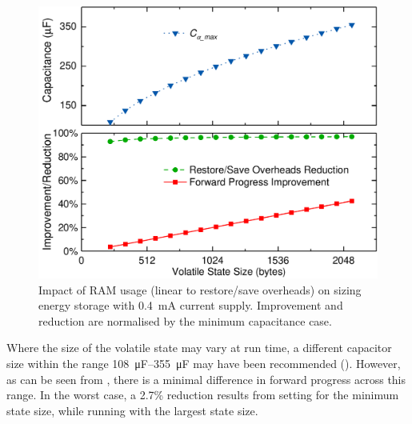 \begin{figure}
    \centering
    \includegraphics[width=\columnwidth]{ch3_sizingeffect/figures/RSTORAM3Fig}
    \caption{Impact of RAM usage (linear to restore/save overheads) on sizing energy storage with \SI{0.4}{\milli\ampere} current supply. Improvement and reduction are normalised by the minimum capacitance case. }
    \label{fig:ram}
\end{figure}

Where the size of the volatile state may vary at run time, a different capacitor size within the range \SIrange{108}{355}{\micro\farad} may have been recommended (). 
However, as can be seen from , there is a minimal difference in forward progress across this range. 
In the worst case, a 2.7\% reduction results from setting  for the minimum state size, while running with the largest state size.
